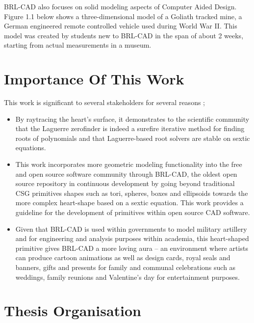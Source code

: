 \hspace{30} BRL­-CAD also focuses on solid modeling aspects of Computer ­Aided
Design. Figure 1.1 below shows a three-­dimensional model of a Goliath tracked
mine, a German engineered remote controlled vehicle used during World War II.
This model was created by students new to BRL-­CAD in the span of about 2
weeks, starting from actual measurements in a museum.


\section{Importance Of This Work}

This work is significant to several stakeholders for several reasons ;

\begin{itemize}
\item By ray­tracing the heart's surface, it demonstrates to the scientific
community that the Laguerre zero­finder is indeed a sure­fire iterative
method for finding roots of polynomials and that Laguerre-­based root 
solvers are stable on sextic equations.
\item This work incorporates more geometric modeling functionality into 
the free and open source software community through BRL-­CAD, the oldest open 
source repository in continuous development \cite{3} by going beyond traditional 
CSG primitives shapes such as tori, spheres, boxes and ellipsoids towards the more
complex heart-shape based on a sextic equation. This work provides a guideline 
for the development of primitives within open source CAD software.
\item Given that BRL­-CAD is used within governments to model military artillery
 and for engineering and analysis purposes within academia, this
heart­-shaped primitive gives BRL-­CAD a more loving aura – an 
environment where artists can produce cartoon animations as well as
design cards, royal seals and banners, gifts and presents for family and
communal celebrations such as weddings, family reunions and
Valentine's day for entertainment purposes.
\end{itemize}


\section{Thesis Organisation}

